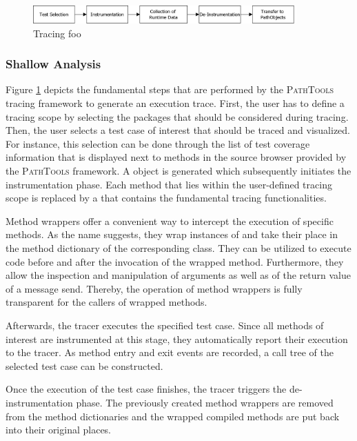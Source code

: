 \begin{figure}[tb]
	\centering
	\includegraphics[width=0.9\textwidth]{../images/02-TracingProcess}
	\caption[TOC Caption]{Tracing foo}
	\label{fig:BackgroundTracingApproach}
\end{figure}

\subsubsection{Shallow Analysis}
Figure \ref{fig:BackgroundTracingApproach} depicts the fundamental steps that are performed by the \textsc{PathTools} tracing framework to generate an execution trace.
First, the user has to define a tracing scope by selecting the packages that should be considered during tracing.
Then, the user selects a test case of interest that should be traced and visualized.
For instance, this selection can be done through the list of test coverage information that is displayed next to methods in the source browser provided by the \textsc{PathTools} framework.
A  object is generated which subsequently initiates the instrumentation phase.
Each method that lies within the user-defined tracing scope is replaced by a  that contains the fundamental tracing functionalities.

Method wrappers \cite{brant_wrappers_1998} offer a convenient way to intercept the execution of specific methods.
As the name suggests, they wrap instances of  and take their place in the method dictionary of the corresponding class.
They can be utilized to execute code before and after the invocation of the wrapped method.
Furthermore, they allow the inspection and manipulation of arguments as well as of the return value of a message send.
Thereby, the operation of method wrappers is fully transparent for the callers of wrapped methods.

Afterwards, the tracer executes the specified test case.
Since all methods of interest are instrumented at this stage, they automatically report their execution to the tracer.
As method entry and exit events are recorded, a call tree of the selected test case can be constructed.

Once the execution of the test case finishes, the tracer triggers the de-instrumentation phase.
The previously created method wrappers are removed from the method dictionaries and the wrapped compiled methods are put back into their original places.

